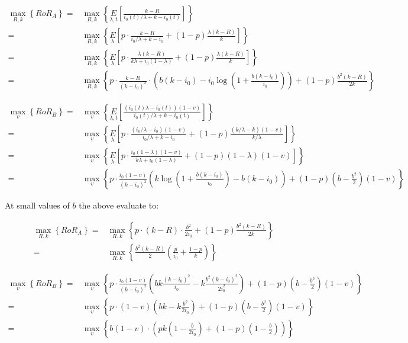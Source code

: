 \begin{align*}
\underset{R,k}\max\left\{RoR_A\right\} =& \underset{R,k}\max\left\{\underset{\lambda, t}E\left[\frac{k-R}{i_0(t)/\lambda + k - i_0(t)}\right]\right\}\\
                                       =& \underset{R,k}\max\left\{\underset{\lambda}E\left[p\cdot\frac{k-R}{i_0/\lambda + k - i_0} + (1-p)\frac{\lambda(k-R)}{k}\right]\right\}\\
                                       =& \underset{R,k}\max\left\{\underset{\lambda}E\left[p\cdot\frac{\lambda(k-R)}{k\lambda + i_0(1-\lambda)} + (1-p)\frac{\lambda(k-R)}{k}\right]\right\}\\
                                       =& \underset{R,k}\max\left\{p\cdot\frac{k-R}{(k-i_0)^2}\cdot\left(b(k-i_0) - i_0 \log\left(1 + \frac{b(k-i_0)}{i_0}\right)\right) + (1-p)\frac{b^2(k-R)}{2k}\right\}
\end{align*}

\begin{align*}
\underset{v}\max\left\{RoR_B\right\} =& \underset{v}\max\left\{\underset{\lambda, t}E\left[\frac{(i_0(t)\lambda - i_0(t))(1-v)}{i_0(t)/\lambda + k - i_0(t)}\right]\right\}\\
                                     =& \underset{v}\max\left\{\underset{\lambda}E\left[p\cdot\frac{(i_0/\lambda - i_0)(1-v)}{i_0/\lambda + k - i_0} + (1-p)\frac{(k/\lambda - k)(1-v)}{k/\lambda}\right]\right\}\\
                                     =& \underset{v}\max\left\{\underset{\lambda}E\left[p\cdot\frac{i_0(1-\lambda)(1-v)}{k\lambda + i_0(1-\lambda)} + (1-p)(1-\lambda)(1-v)\right]\right\}\\
                                     =& \underset{v}\max\left\{p\cdot\frac{i_0(1-v)}{(k-i_0)^2}\left(k\log\left(1+\frac{b(k-i_0)}{i_0}\right) - b(k-i_0)\right) + (1-p)(b-\frac{b^2}{2})(1-v)\right\}
\end{align*}

At small values of $b$ the above evaluate to:

\begin{align*}
\underset{R,k}\max\left\{RoR_A\right\} =& \underset{R,k}\max\left\{p\cdot(k-R)\cdot\frac{b^2}{2i_0} + (1-p)\frac{b^2(k-R)}{2k}\right\}\\
                                       =& \underset{R,k}\max\left\{\frac{b^2(k-R)}{2}\left(\frac{p}{i_0} + \frac{1-p}{k}\right)\right\}
\end{align*}

\begin{align*}
\underset{v}\max\left\{RoR_B\right\} =& \underset{v}\max\left\{p\cdot\frac{i_0(1-v)}{(k-i_0)^2}\left(bk\frac{(k-i_0)^2}{i_0}- k\frac{b^2(k-i_0)^2}{2i_0^2} \right) + (1-p)(b-\frac{b^2}{2})(1-v)\right\}\\
                                     =& \underset{v}\max\left\{p\cdot(1-v)\left(bk- k\frac{b^2}{2i_0}\right) + (1-p)(b-\frac{b^2}{2})(1-v)\right\}\\
                                     =& \underset{v}\max\left\{b(1-v)\cdot \left(pk(1-\frac{b}{2i_0}) + (1-p)(1-\frac{b}{2})\right)\right\}
\end{align*}
